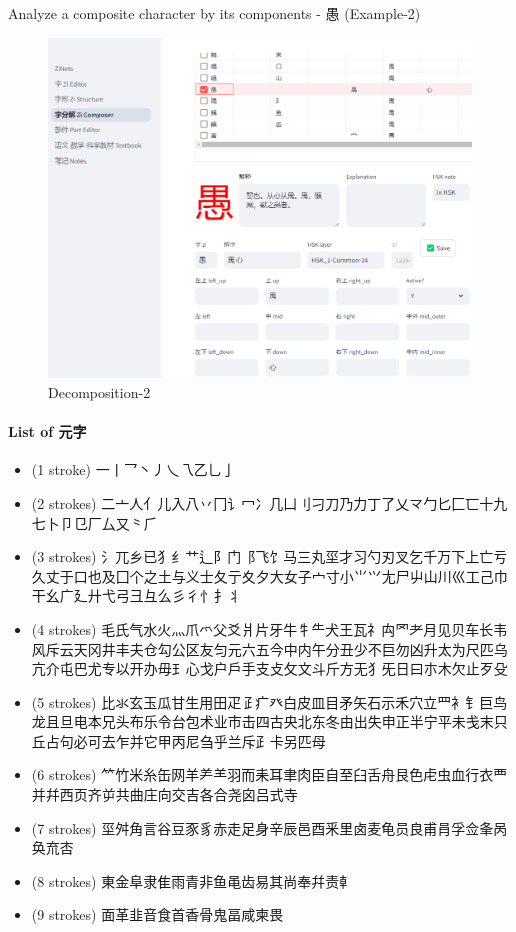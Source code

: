 \documentclass[
  11pt,
  letterpaper,
]{article}
\providecommand{\tightlist}{%
  \setlength{\itemsep}{0pt}\setlength{\parskip}{0pt}}
\begin{document}
Analyze a composite character by its components - 愚 (Example-2)

\begin{figure}
\centering
\includegraphics{./images/app_zi-parts_2.png}
\caption{Decomposition-2}
\end{figure}

\paragraph{List of 元字}\label{list-of-ux5143ux5b57}

\begin{itemize}
\tightlist
\item
  (1 stroke) 一丨乛丶丿乀乁乙乚亅
\item
  (2 strokes)
  二亠人亻儿入八丷冂讠冖冫几凵刂刁刀乃力丁了乂龴勹匕匚匸十九七卜卩㔾厂厶又⺀⺁
\item
  (3 strokes)
  氵兀乡已犭纟艹辶阝门⻏飞饣马三丸坙才习勺刃叉乞千万下上亡亏久丈于口也及囗个之土与义士夂亍夊夕大女子宀寸小⺌⺍尢尸屮山川巛工己巾干幺广廴廾弋弓彐彑么彡彳忄扌丬
\item
  (4 strokes)
  毛氏气水火灬爪爫父爻爿片牙牛牜⺧犬王瓦礻禸罓耂月见贝车长韦风斥云天冈井丰夫仓勾公区友匀元六五今中内午分丑少不巨勿凶升太为尺匹乌亢介屯巴尤专以开办毋⺩心戈户戶手支攴攵文斗斤方无犭旡日曰朩木欠止歹殳
\item
  (5 strokes)
  比氺玄玉瓜甘生用田疋𤴔疒癶白皮皿目矛矢石示禾穴立罒衤钅巨鸟龙且旦电本兄头布乐令台包术业市击四古央北东冬由出失申正半宁平未戋末只丘占句必可去乍并它甲丙尼刍乎兰斥⺪卡另匹母
\item
  (6 strokes)
  ⺮竹米糸缶网羊⺶⺷羽而耒耳聿肉臣自至臼舌舟艮色虍虫血行衣覀并幷西页齐屰共曲庄向交吉各合尧囟吕式寺
\item
  (7 strokes)
  坙舛角言谷豆豕豸赤走足身辛辰邑酉釆里卤麦龟员良甫肙孚佥夆呙奂㐬㕻
\item
  (8 strokes) 東金阜隶隹雨青非鱼黾齿易其尚奉幷责龺
\item
  (9 strokes) 面革韭音食首香骨鬼畐咸柬畏
\end{itemize}
\end{document}
